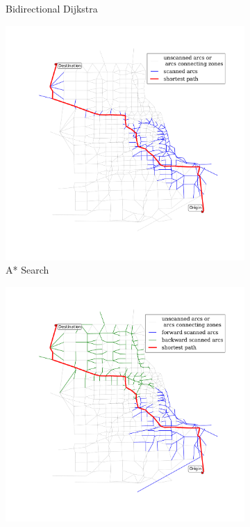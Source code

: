 \begin{figure}[H]
\begin{subfigure}{.5\textwidth}
        \caption{Bidirectional Dijkstra}
        \label{fig:chicago_bidirect}
    \end{subfigure}
    \begin{subfigure}{.5\textwidth}
        \centering
        \includegraphics[width=\textwidth,trim=120px 120px 48px 0px,clip]{img/chicago_astar}
        \caption{A* Search}
        \label{fig:chicago_astar}
    \end{subfigure}%
    \begin{subfigure}{.5\textwidth}
        \centering
        \includegraphics[width=\textwidth,trim=120px 120px 48px 0px,clip]{img/chicago_astar_bidirect}

\end{subfigure}
\end{figure}
